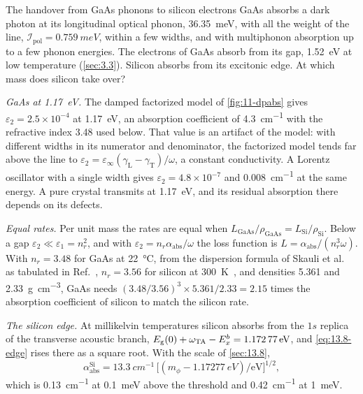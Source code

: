 \begin{workedexample}{The handover from GaAs phonons to silicon electrons}\label{we:17-handover}
GaAs absorbs a dark photon at its longitudinal optical phonon, \SI{36.35}{meV}, with all the weight of the line, $\mathcal{I}_{\mathrm{pol}} = \SI{0.759}{meV}$, within a few widths, and with multiphonon absorption up to a few phonon energies. The electrons of GaAs absorb from its gap, \SI{1.52}{eV} at low temperature (\cref{sec:3.3}). Silicon absorbs from its excitonic edge. At which mass does silicon take over?

\emph{GaAs at \SI{1.17}{eV}.} The damped factorized model of \cref{fig:11-dpabs} gives $\varepsilon_2 = 2.5\times10^{-4}$ at \SI{1.17}{eV}, an absorption coefficient of \SI{4.3}{cm^{-1}} with the refractive index 3.48 used below. That value is an artifact of the model: with different widths in its numerator and denominator, the factorized model tends far above the line to $\varepsilon_2 = \varepsilon_\infty(\gamma_{\mathrm{L}} - \gamma_{\mathrm{T}})/\omega$, a constant conductivity. A Lorentz oscillator with a single width gives $\varepsilon_2 = 4.8\times10^{-7}$ and \SI{0.008}{cm^{-1}} at the same energy. A pure crystal transmits at \SI{1.17}{eV}, and its residual absorption there depends on its defects.

\emph{Equal rates.} Per unit mass the rates are equal when $L_{\mathrm{GaAs}}/\rho_{\mathrm{GaAs}} = L_{\mathrm{Si}}/\rho_{\mathrm{Si}}$. Below a gap $\varepsilon_2 \ll \varepsilon_1 = n_r^2$, and with $\varepsilon_2 = n_r\alpha_{\mathrm{abs}}/\omega$ the loss function is $L = \alpha_{\mathrm{abs}}/(n_r^3\omega)$. With $n_r = 3.48$ for GaAs at \SI{22}{\celsius}, from the dispersion formula of Skauli et al.~\cite{skauli2003improved} as tabulated in Ref.~\cite{polyanskiy2024refractiveindex}, $n_r = 3.56$ for silicon at \SI{300}{K}~\cite{franta2017temperature}, and densities 5.361 and \SI{2.33}{g.cm^{-3}}, GaAs needs $(3.48/3.56)^3\times5.361/2.33 = 2.15$ times the absorption coefficient of silicon to match the silicon rate.

\emph{The silicon edge.} At millikelvin temperatures silicon absorbs from the $1s$ replica of the transverse acoustic branch, $E_{\mathrm{g}}(0) + \omega_{\mathrm{TA}} - E_x^b = \SI{1.17277}{eV}$, and \cref{eq:13.8-edge} rises there as a square root. With the scale of \cref{sec:13.8},
\begin{equation*}
  \alpha_{\mathrm{abs}}^{\mathrm{Si}} = \SI{13.3}{cm^{-1}}\,\bigl[(m_\phi - \SI{1.17277}{eV})/\mathrm{eV}\bigr]^{1/2} ,
\end{equation*}
which is \SI{0.13}{cm^{-1}} at \SI{0.1}{meV} above the threshold and \SI{0.42}{cm^{-1}} at \SI{1}{meV}.


\end{workedexample}
